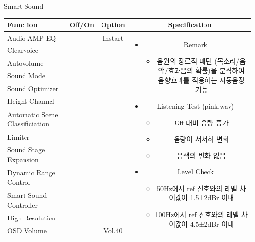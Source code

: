 \documentclass{beamer}
\begin{document}
\begin{frame}[t]{Smart Sound}
\begin{tiny}
\begin{tabular}{@{}lccc@{}}
\toprule
Function & Off/On & Option & Specification \\
\midrule
Audio AMP EQ & \color{black}{Off} & Instart &
\multirow{13}{60mm}{
\begin{itemize}
\item Remark
	\begin{itemize}
	\item 음원의 장르적 패턴 (목소리/음악/효과음의 확률)을 분석하여 음향효과를 적용하는 자동음장 기능
	\end{itemize}
\item Listening Test (pink.wav)
	\begin{itemize}
	\item Off 대비 음량 증가
	\item 음량이 서서히 변화
	\item 음색의 변화 없음
	\end{itemize}
\item Level Check
  \begin{itemize}
  \item 50Hz에서 ref 신호와의 레벨 차이값이 1.5±2dBr 이내
  \item 100Hz에서 ref 신호와의 레벨 차이값이 4.5±2dBr 이내
  \end{itemize}
\end{itemize}
} \\
Clearvoice & \color{black}{Off} & & \\
Autovolume & \color{black}{Off} & & \\
Sound Mode & \color{black}{Off} & & \\
Sound Optimizer & \color{black}{Off} & & \\
Height Channel & \color{black}{Off} & & \\
Automatic Scene Classificiation & \color{blue}{On} & & \\
Limiter & \color{black}{Off} & & \\
Sound Stage Expansion & \color{blue}{On} & & \\
Dynamic Range Control & \color{black}{Off} & & \\
Smart Sound Controller & \color{blue}{On} & & \\
High Resolution & \color{black}{Off} & & \\
OSD Volume & \color{blue}{On} & Vol.40 & \\
\midrule
\end{tabular}
\end{tiny}

\end{frame}
\end{document}
